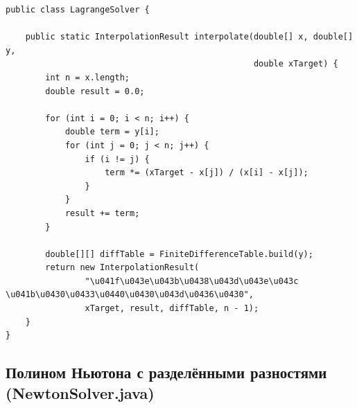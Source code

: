 \begin{lstlisting}[style=javaStyle, label=code:lagrange]
public class LagrangeSolver {

    public static InterpolationResult interpolate(double[] x, double[] y,
                                                  double xTarget) {
        int n = x.length;
        double result = 0.0;

        for (int i = 0; i < n; i++) {
            double term = y[i];
            for (int j = 0; j < n; j++) {
                if (i != j) {
                    term *= (xTarget - x[j]) / (x[i] - x[j]);
                }
            }
            result += term;
        }

        double[][] diffTable = FiniteDifferenceTable.build(y);
        return new InterpolationResult(
                "\u041f\u043e\u043b\u0438\u043d\u043e\u043c \u041b\u0430\u0433\u0440\u0430\u043d\u0436\u0430",
                xTarget, result, diffTable, n - 1);
    }
}
\end{lstlisting}

\subsection{Полином Ньютона с разделёнными разностями (NewtonSolver.java)}


